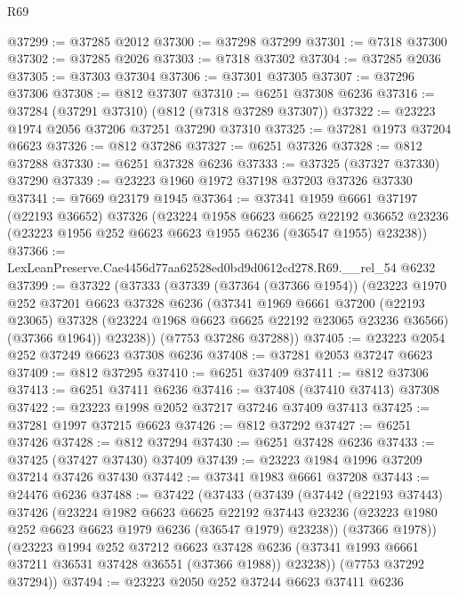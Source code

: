 \begin{lexlean}{R69}
\begin{coremodule}
{@37299 := @37285 @2012
@37300 := @37298 @37299
@37301 := @7318 @37300
@37302 := @37285 @2026
@37303 := @7318 @37302
@37304 := @37285 @2036
@37305 := @37303 @37304
@37306 := @37301 @37305
@37307 := @37296 @37306
@37308 := @812 @37307
@37310 := @6251 @37308 @6236
@37316 := @37284 (@37291 @37310) (@812 (@7318 @37289 @37307))
@37322 := @23223 @1974 @2056 @37206 @37251 @37290 @37310
@37325 := @37281 @1973 @37204 @6623
@37326 := @812 @37286
@37327 := @6251 @37326
@37328 := @812 @37288
@37330 := @6251 @37328 @6236
@37333 := @37325 (@37327 @37330) @37290
@37339 := @23223 @1960 @1972 @37198 @37203 @37326 @37330
@37341 := @7669 @23179 @1945
@37364 := @37341
    @1959
    @6661
    @37197
    (@22193 @36652)
    @37326
    (@23224
      @1958
      @6623
      @6625
      @22192
      @36652
      @23236
      (@23223 @1956 @252 @6623 @6623 @1955 @6236 (@36547 @1955) @23238))
@37366 := LexLeanPreserve.Cae4456d77aa62528ed0bd9d0612cd278.R69.__rel_54 @6232
@37399 := @37322
    (@37333
      (@37339
        (@37364 (@37366 @1954))
        (@23223
          @1970
          @252
          @37201
          @6623
          @37328
          @6236
          (@37341
            @1969
            @6661
            @37200
            (@22193 @23065)
            @37328
            (@23224 @1968 @6623 @6625 @22192 @23065 @23236 @36566)
            (@37366 @1964))
          @23238))
      (@7753 @37286 @37288))
@37405 := @23223 @2054 @252 @37249 @6623 @37308 @6236
@37408 := @37281 @2053 @37247 @6623
@37409 := @812 @37295
@37410 := @6251 @37409
@37411 := @812 @37306
@37413 := @6251 @37411 @6236
@37416 := @37408 (@37410 @37413) @37308
@37422 := @23223 @1998 @2052 @37217 @37246 @37409 @37413
@37425 := @37281 @1997 @37215 @6623
@37426 := @812 @37292
@37427 := @6251 @37426
@37428 := @812 @37294
@37430 := @6251 @37428 @6236
@37433 := @37425 (@37427 @37430) @37409
@37439 := @23223 @1984 @1996 @37209 @37214 @37426 @37430
@37442 := @37341 @1983 @6661 @37208
@37443 := @24476 @6236
@37488 := @37422
    (@37433
      (@37439
        (@37442
          (@22193 @37443)
          @37426
          (@23224
            @1982
            @6623
            @6625
            @22192
            @37443
            @23236
            (@23223 @1980 @252 @6623 @6623 @1979 @6236 (@36547 @1979) @23238))
          (@37366 @1978))
        (@23223
          @1994
          @252
          @37212
          @6623
          @37428
          @6236
          (@37341 @1993 @6661 @37211 @36531 @37428 @36551 (@37366 @1988))
          @23238))
      (@7753 @37292 @37294))
@37494 := @23223 @2050 @252 @37244 @6623 @37411 @6236
}
\end{coremodule}
\end{lexlean}
